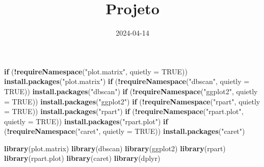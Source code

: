 \documentclass[
]{article}
\title{Projeto}
\author{}
\date{\vspace{-2.5em}2024-04-14}
\newenvironment{Shaded}{\begin{snugshade}}{\end{snugshade}}
\newcommand{\AttributeTok}[1]{\textcolor[rgb]{0.13,0.29,0.53}{#1}}
\newcommand{\ConstantTok}[1]{\textcolor[rgb]{0.56,0.35,0.01}{#1}}
\newcommand{\ControlFlowTok}[1]{\textcolor[rgb]{0.13,0.29,0.53}{\textbf{#1}}}
\newcommand{\FunctionTok}[1]{\textcolor[rgb]{0.13,0.29,0.53}{\textbf{#1}}}
\newcommand{\NormalTok}[1]{#1}
\newcommand{\SpecialCharTok}[1]{\textcolor[rgb]{0.81,0.36,0.00}{\textbf{#1}}}
\newcommand{\StringTok}[1]{\textcolor[rgb]{0.31,0.60,0.02}{#1}}
\begin{document}
\maketitle

\begin{Shaded}
\begin{Highlighting}[]
\ControlFlowTok{if}\NormalTok{ (}\SpecialCharTok{!}\FunctionTok{requireNamespace}\NormalTok{(}\StringTok{"plot.matrix"}\NormalTok{, }\AttributeTok{quietly =} \ConstantTok{TRUE}\NormalTok{)) }\FunctionTok{install.packages}\NormalTok{(}\StringTok{"plot.matrix"}\NormalTok{)}
\ControlFlowTok{if}\NormalTok{ (}\SpecialCharTok{!}\FunctionTok{requireNamespace}\NormalTok{(}\StringTok{"dbscan"}\NormalTok{, }\AttributeTok{quietly =} \ConstantTok{TRUE}\NormalTok{)) }\FunctionTok{install.packages}\NormalTok{(}\StringTok{"dbscan"}\NormalTok{)}
\ControlFlowTok{if}\NormalTok{ (}\SpecialCharTok{!}\FunctionTok{requireNamespace}\NormalTok{(}\StringTok{"ggplot2"}\NormalTok{, }\AttributeTok{quietly =} \ConstantTok{TRUE}\NormalTok{)) }\FunctionTok{install.packages}\NormalTok{(}\StringTok{"ggplot2"}\NormalTok{)}
\ControlFlowTok{if}\NormalTok{ (}\SpecialCharTok{!}\FunctionTok{requireNamespace}\NormalTok{(}\StringTok{"rpart"}\NormalTok{, }\AttributeTok{quietly =} \ConstantTok{TRUE}\NormalTok{)) }\FunctionTok{install.packages}\NormalTok{(}\StringTok{"rpart"}\NormalTok{)}
\ControlFlowTok{if}\NormalTok{ (}\SpecialCharTok{!}\FunctionTok{requireNamespace}\NormalTok{(}\StringTok{"rpart.plot"}\NormalTok{, }\AttributeTok{quietly =} \ConstantTok{TRUE}\NormalTok{)) }\FunctionTok{install.packages}\NormalTok{(}\StringTok{"rpart.plot"}\NormalTok{)}
\ControlFlowTok{if}\NormalTok{ (}\SpecialCharTok{!}\FunctionTok{requireNamespace}\NormalTok{(}\StringTok{"caret"}\NormalTok{, }\AttributeTok{quietly =} \ConstantTok{TRUE}\NormalTok{)) }\FunctionTok{install.packages}\NormalTok{(}\StringTok{"caret"}\NormalTok{)}

\FunctionTok{library}\NormalTok{(plot.matrix)}
\FunctionTok{library}\NormalTok{(dbscan)}
\FunctionTok{library}\NormalTok{(ggplot2)}
\FunctionTok{library}\NormalTok{(rpart)}
\FunctionTok{library}\NormalTok{(rpart.plot)}
\FunctionTok{library}\NormalTok{(caret)}
\FunctionTok{library}\NormalTok{(dplyr)}



\end{Highlighting}
\end{Shaded}
\end{document}
